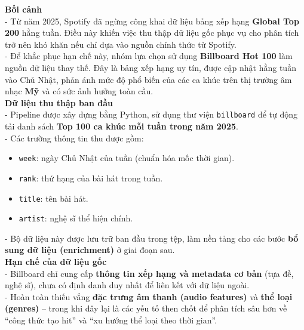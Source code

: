     \textbf{Bối cảnh} \\
    
    - Từ năm 2025, Spotify đã ngừng công khai dữ liệu bảng xếp hạng \textbf{Global Top 200} hằng tuần. Điều này khiến việc thu thập dữ liệu gốc phục vụ cho phân tích trở nên khó khăn nếu chỉ dựa vào nguồn chính thức từ Spotify. \\
    
    - Để khắc phục hạn chế này, nhóm lựa chọn sử dụng \textbf{Billboard Hot 100} 
    làm nguồn dữ liệu thay thế. Đây là bảng xếp hạng uy tín, được cập nhật hằng tuần vào Chủ Nhật, phản ánh mức độ phổ biến của các ca khúc trên thị trường âm nhạc \textbf{Mỹ} và có sức ảnh hưởng toàn cầu. \\
    
    \textbf{Dữ liệu thu thập ban đầu} \\
    
    - Pipeline được xây dựng bằng Python, sử dụng thư viện \texttt{billboard} để tự động tải danh sách \textbf{Top 100 ca khúc mỗi tuần trong năm 2025}. \\
    
    - Các trường thông tin thu được gồm:
    \begin{itemize}
        \item \texttt{week}: ngày Chủ Nhật của tuần (chuẩn hóa mốc thời gian).
        \item \texttt{rank}: thứ hạng của bài hát trong tuần.
        \item \texttt{title}: tên bài hát.
        \item \texttt{artist}: nghệ sĩ thể hiện chính.
    \end{itemize}
    
    - Bộ dữ liệu này được lưu trữ ban đầu trong tệp, làm nền tảng cho các bước \textbf{bổ sung dữ liệu (enrichment)} ở giai đoạn sau. \\
    
    \textbf{Hạn chế của dữ liệu gốc} \\
    
    - Billboard chỉ cung cấp \textbf{thông tin xếp hạng và metadata cơ bản} (tựa đề, nghệ sĩ), chưa có định danh duy nhất để liên kết với dữ liệu ngoài. \\
    
    - Hoàn toàn thiếu vắng \textbf{đặc trưng âm thanh (audio features)} 
    và \textbf{thể loại (genres)} – trong khi đây lại là các yếu tố then chốt để phân tích sâu hơn về “công thức tạo hit” và “xu hướng thể loại theo thời gian”. \\

